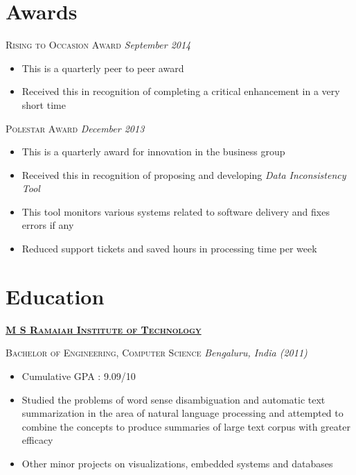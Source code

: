 \documentclass[]{article}
\begin{document}
\section{Awards}
{\raggedright\textsc{Rising to Occasion Award} \hfill {\raggedleft\textit{September 2014}}

\begin{itemize}
\item This is a quarterly peer to peer award
\item Received this in recognition of completing a critical enhancement in a very short time
\end{itemize}

{\raggedright\textsc{Polestar Award} \hfill {\raggedleft\textit{December 2013}}

\begin{itemize}

\item This is a quarterly award for innovation in the business group
\item Received this in recognition of proposing and developing \textit{Data Inconsistency Tool}
\item This tool monitors various systems related to software delivery and fixes errors if any
\item Reduced support tickets and saved hours in processing time per week  
\end{itemize}

\section{Education}

{\raggedright\textsc{\textbf{\href{http://www.msrit.edu/}{M S Ramaiah Institute of Technology}}}

{\raggedright\textsc{Bachelor of Engineering, Computer Science} \hfill {\raggedleft\textit{Bengaluru, India (2011)}}

\begin{itemize}
\item Cumulative GPA : 9.09/10
\item Studied the problems of word sense disambiguation and automatic text summarization in the area of natural language processing and attempted to combine the concepts to produce summaries of large text corpus with greater efficacy
\item Other minor projects on visualizations, embedded systems and databases
\end{itemize}

}}}}
\end{document}
